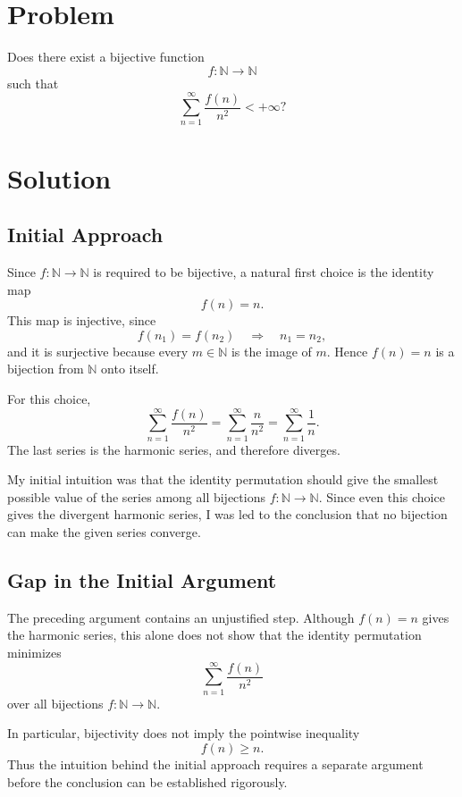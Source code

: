 \documentclass{article}
\begin{document}
\maketitle

\section*{Problem}

Does there exist a bijective function
\[
f:\mathbb{N}\to\mathbb{N}
\]
such that
\[
\sum_{n=1}^{\infty}\frac{f(n)}{n^2}<+\infty?
\]

\section*{Solution}

\subsection*{Initial Approach}

Since \(f:\mathbb{N}\to\mathbb{N}\) is required to be bijective, a natural
first choice is the identity map
\[
f(n)=n.
\]
This map is injective, since
\[
f(n_1)=f(n_2)
\quad\Longrightarrow\quad
n_1=n_2,
\]
and it is surjective because every \(m\in\mathbb{N}\) is the image of
\(m\). Hence \(f(n)=n\) is a bijection from \(\mathbb{N}\) onto itself.

For this choice,
\[
\sum_{n=1}^{\infty}\frac{f(n)}{n^2}
=
\sum_{n=1}^{\infty}\frac{n}{n^2}
=
\sum_{n=1}^{\infty}\frac{1}{n}.
\]
The last series is the harmonic series, and therefore diverges.

My initial intuition was that the identity permutation should give the
smallest possible value of the series among all bijections
\(f:\mathbb{N}\to\mathbb{N}\). Since even this choice gives the divergent
harmonic series, I was led to the conclusion that no bijection can make
the given series converge.

\subsection*{Gap in the Initial Argument}

The preceding argument contains an unjustified step. Although
\(f(n)=n\) gives the harmonic series, this alone does not show that the
identity permutation minimizes
\[
\sum_{n=1}^{\infty}\frac{f(n)}{n^2}
\]
over all bijections \(f:\mathbb{N}\to\mathbb{N}\).

In particular, bijectivity does not imply the pointwise inequality
\[
f(n)\geq n.
\]
Thus the intuition behind the initial approach requires a separate
argument before the conclusion can be established rigorously.
\end{document}
